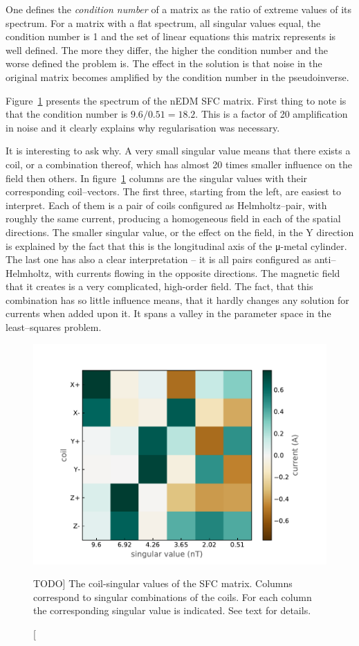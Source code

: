 One defines the \emph{condition number} of a matrix as the ratio of extreme values of its spectrum. For a matrix with a flat spectrum, all singular values equal, the condition number is 1 and the set of linear equations this matrix represents is well defined. The more they differ, the higher the condition number and the worse defined the problem is. The effect in the solution is that noise in the original matrix becomes amplified by the condition number in the pseudoinverse.

Figure~\ref{fig:nEDM_SFC_svd} presents the spectrum of the nEDM SFC matrix. First thing to note is that the condition number is $9.6 / 0.51 = 18.2$. This is a factor of 20 amplification in noise and it clearly explains why regularisation was necessary.

It is interesting to ask why. A very small singular value means that there exists a coil, or a combination thereof, which has almost 20 times smaller influence on the field then others. In figure~\ref{fig:nEDM_SFC_svd} columns are the singular values with their corresponding coil--vectors. The first three, starting from the left, are easiest to interpret. Each of them is a pair of coils configured as Helmholtz--pair, with roughly the same current, producing a homogeneous field in each of the spatial directions. The smaller singular value, or the effect on the field, in the Y direction is explained by the fact that this is the longitudinal axis of the μ-metal cylinder. The last one has also a clear interpretation -- it is all pairs configured as anti--Helmholtz, with currents flowing in the opposite directions. The magnetic field that it creates is a very complicated, high-order field. The fact, that this combination has so little influence means, that it hardly changes any solution for currents when added upon it. It spans a valley in the parameter space in the least--squares problem.

\begin{figure}[bth]
  \myfloatalign
  \includegraphics[width=.7\linewidth]{gfx/nEDM_SFC/coil-singular_vectors_of_the_nEDM_SFC_matrix}
  \caption
  [TODO]
  {The coil-singular values of the SFC matrix. Columns correspond to singular combinations of the coils. For each column the corresponding singular value is indicated. See text for details.}
  \label{fig:nEDM_SFC_svd}
\end{figure}

